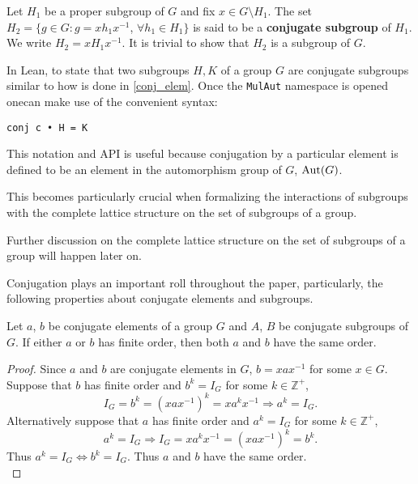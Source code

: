 \begin{definition}
Let $H_1$ be a proper subgroup of $G$ and fix $x \in G \setminus H_1$. The set $H_2 = \{g \in G : g= xh_1x^{-1}$, $\forall h_1 \in H_1\}$ is said to be a \textbf{conjugate subgroup} of $H_1$. We write $H_2 = xH_1x^{-1}$. It is trivial to show that $H_2$ is a subgroup of $G$.
\end{definition}

\begin{remark}
In Lean, to state that two subgroups $H, K$ of a group $G$ are conjugate subgroups similar to how is done 
in \ref{conj_elem}. Once the \texttt{MulAut} namespace is opened onecan make use of the convenient syntax:

\begin{verbatim}
conj c • H = K 
\end{verbatim}

This notation and API is useful because conjugation by a particular element is defined to be an element in the automorphism group of $G$, $\operatorname{Aut}(G)$. 

This becomes particularly crucial when formalizing the interactions of subgroups with the complete lattice structure on the set of subgroups of a group. 

Further discussion on the complete lattice structure on the set of subgroups of a group will happen later on.
\end{remark}

Conjugation plays an important roll throughout the paper, 
particularly, the following properties about conjugate elements and subgroups.

\begin{proposition}
    \label{orderOf_injective}
Let $a$, $b$ be conjugate elements of a group $G$ and $A$, $B$ be conjugate subgroups of $G$.
If either $a$ or $b$ has finite order, then both $a$ and $b$ have the same order.
\end{proposition}

\begin{proof}
    Since $a$ and $b$ are conjugate elements in $G$, $b = xax^{-1}$ for some $x \in G$. Suppose that $b$ has finite order and $b^k = I_G$ for some $k \in \mathbb{Z}^+$,
    \begin{equation*} 
        I_G = b^k = (xax^{-1})^k = xa^{k}x^{-1} \Rightarrow a^k = I_G.
    \end{equation*}
    Alternatively suppose that $a$ has finite order and $a^k = I_G$ for some $k \in \mathbb{Z}^+$,
    \begin{equation*} 
        a^k = I_G \Rightarrow I_G = xa^{k}x^{-1} = (xax^{-1})^k = b^k.
    \end{equation*}
    Thus $a^k = I_G \iff b^k = I_G$. Thus $a$ and $b$ have the same order. \\
\end{proof}


